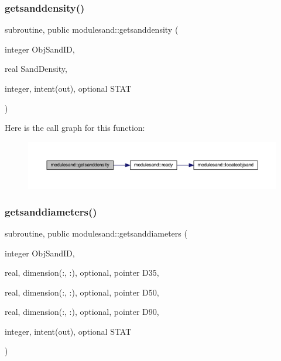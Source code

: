 \subsubsection{\texorpdfstring{getsanddensity()}{getsanddensity()}}
{\footnotesize\ttfamily subroutine, public modulesand\+::getsanddensity (\begin{DoxyParamCaption}\item[{integer}]{Obj\+Sand\+ID,  }\item[{real}]{Sand\+Density,  }\item[{integer, intent(out), optional}]{S\+T\+AT }\end{DoxyParamCaption})}

Here is the call graph for this function\+:\nopagebreak
\begin{figure}[H]
\begin{center}
\leavevmode
\includegraphics[width=350pt]{namespacemodulesand_a4e0db1b5661a069c0d842ef833c61439_cgraph}
\end{center}
\end{figure}
\mbox{\label{namespacemodulesand_a622d6481ea9786885f9078db350e31ca}} 
\subsubsection{\texorpdfstring{getsanddiameters()}{getsanddiameters()}}
{\footnotesize\ttfamily subroutine, public modulesand\+::getsanddiameters (\begin{DoxyParamCaption}\item[{integer}]{Obj\+Sand\+ID,  }\item[{real, dimension(\+:, \+:), optional, pointer}]{D35,  }\item[{real, dimension(\+:, \+:), optional, pointer}]{D50,  }\item[{real, dimension(\+:, \+:), optional, pointer}]{D90,  }\item[{integer, intent(out), optional}]{S\+T\+AT }\end{DoxyParamCaption})}

